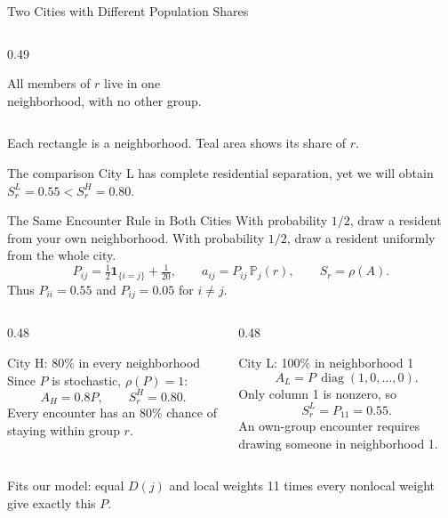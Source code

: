 \documentclass{beamer}
\begin{document}
\begin{frame}{Two Cities with Different Population Shares}
\begin{columns}[T]
\begin{column}{0.49\textwidth}
\par\vspace{0.1cm}
All members of $r$ live in one\\neighborhood, with no other group.
\end{column}
\end{columns}
\vspace{0.15cm}
{\footnotesize Each rectangle is a neighborhood. Teal area shows its share of $r$.}
\begin{block}{The comparison}
City L has complete residential separation, yet we will obtain
\alert{$S_r^{L}=0.55 < S_r^{H}=0.80$}.
\end{block}
\end{frame}

\begin{frame}{The Same Encounter Rule in Both Cities}
\small
With probability $1/2$, draw a resident from your own neighborhood.
With probability $1/2$, draw a resident uniformly from the whole city.
\[
 P_{ij}=\tfrac12\mathbf{1}_{\{i=j\}}+\tfrac1{20},
 \qquad
 a_{ij}=P_{ij}\,\mathbb{P}_j(r),
 \qquad S_r=\rho(A).
\]
Thus $P_{ii}=0.55$ and $P_{ij}=0.05$ for $i\ne j$.
\vspace{0.1cm}
\begin{columns}[T]
\begin{column}{0.48\textwidth}
\begin{block}{City H: 80\% in every neighborhood}
Since $P$ is stochastic, $\rho(P)=1$:
\[
 A_H=0.8P,\qquad \boxed{S_r^H=0.80.}
\]
Every encounter has an 80\% chance of staying within group $r$.
\end{block}
\end{column}
\begin{column}{0.48\textwidth}
\begin{block}{City L: 100\% in neighborhood 1}
\[
 A_L=P\,\operatorname{diag}(1,0,\ldots,0).
\]
Only column 1 is nonzero, so
\[
 \boxed{S_r^L=P_{11}=0.55.}
\]
An own-group encounter requires drawing someone in neighborhood 1.
\end{block}
\end{column}
\end{columns}
\vspace{0.1cm}
{\footnotesize Fits our model: equal $D(j)$ and local weights 11 times every
nonlocal weight give exactly this $P$.}
\end{frame}
\end{document}
